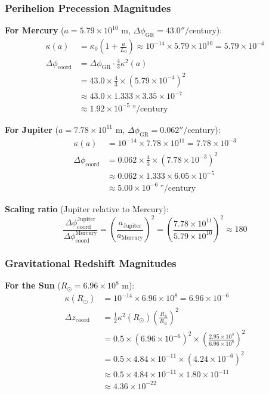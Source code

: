 \documentclass[11pt,a4paper]{article}
\begin{document}
\subsubsection{Perihelion Precession Magnitudes}

\textbf{For Mercury} ($a = 5.79 \times 10^{10}$ m, $\Delta\phi_{\text{GR}} = 43.0''/$century):
\begin{align}
	\kappa(a) &= \kappa_0 \left(1 + \frac{a}{L_0}\right) 
	\approx 10^{-14} \times 5.79 \times 10^{10} = 5.79 \times 10^{-4} \\
	\Delta\phi_{\text{coord}} &= \Delta\phi_{\text{GR}} \cdot \frac{4}{3} \kappa^2(a) \\
	&= 43.0 \times \frac{4}{3} \times (5.79 \times 10^{-4})^2 \\
	&\approx 43.0 \times 1.333 \times 3.35 \times 10^{-7} \\
	&\approx 1.92 \times 10^{-5} \ \text{''}/\text{century}
\end{align}

\textbf{For Jupiter} ($a = 7.78 \times 10^{11}$ m, $\Delta\phi_{\text{GR}} = 0.062''/$century):
\begin{align}
	\kappa(a) &= 10^{-14} \times 7.78 \times 10^{11} = 7.78 \times 10^{-3} \\
	\Delta\phi_{\text{coord}} &= 0.062 \times \frac{4}{3} \times (7.78 \times 10^{-3})^2 \\
	&\approx 0.062 \times 1.333 \times 6.05 \times 10^{-5} \\
	&\approx 5.00 \times 10^{-6}~\text{''}/\text{century}
\end{align}

\textbf{Scaling ratio} (Jupiter relative to Mercury):
\begin{equation}
	\frac{\Delta\phi_{\text{coord}}^{\text{Jupiter}}}{\Delta\phi_{\text{coord}}^{\text{Mercury}}}
	= \left(\frac{a_{\text{Jupiter}}}{a_{\text{Mercury}}}\right)^2 
	= \left(\frac{7.78 \times 10^{11}}{5.79 \times 10^{10}}\right)^2 \approx 180
\end{equation}

\subsubsection{Gravitational Redshift Magnitudes}

\textbf{For the Sun} ($R_\odot = 6.96 \times 10^8$ m):
\begin{align}
	\kappa(R_\odot) &= 10^{-14} \times 6.96 \times 10^8 = 6.96 \times 10^{-6} \\
	\Delta z_{\text{coord}} &= \frac{1}{2} \kappa^2(R_\odot) \left(\frac{R_S}{R_\odot}\right)^2 \\
	&= 0.5 \times (6.96 \times 10^{-6})^2 \times \left(\frac{2.95 \times 10^3}{6.96 \times 10^8}\right)^2 \\
	&= 0.5 \times 4.84 \times 10^{-11} \times (4.24 \times 10^{-6})^2 \\
	&\approx 0.5 \times 4.84 \times 10^{-11} \times 1.80 \times 10^{-11} \\
	&\approx 4.36 \times 10^{-22}
\end{align}
\end{document}
